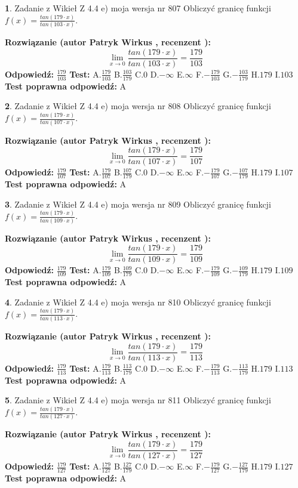 \documentclass[12pt, a4paper]{article}
\theoremstyle{definition} %
\newtheorem{zad}{}
\newcommand{\zadStart}[1]{\begin{zad}#1\newline}
\newcommand{\zadStop}{\end{zad}}
\newcommand{\rozwStart}[2]{\noindent \textbf{Rozwiązanie (autor #1 , recenzent #2): }\newline}
\newcommand{\rozwStop}{\newline}
\newcommand{\odpStart}{\noindent \textbf{Odpowiedź:}\newline}
\newcommand{\odpStop}{\newline}
\newcommand{\testStart}{\noindent \textbf{Test:}\newline}
\newcommand{\testStop}{\newline}
\newcommand{\kluczStart}{\noindent \textbf{Test poprawna odpowiedź:}\newline}
\newcommand{\kluczStop}{\newline}
\begin{document}
\zadStart{Zadanie z Wikieł Z 4.4 e) moja wersja nr 807}
Obliczyć granicę funkcji $f(x)=\frac{tan(179\cdot x)}{tan(103\cdot x)}$.
\zadStop
\rozwStart{Patryk Wirkus}{}
$$\lim\limits_{x\to 0}\frac{tan(179\cdot x)}{tan(103\cdot x)}=
\frac{179}{103}$$
\rozwStop
\odpStart
$\frac{179}{103}$
\odpStop
\testStart
A.$\frac{179}{103}$
B.$\frac{103}{179}$
C.$0$
D.$-\infty$
E.$\infty$
F.$-\frac{179}{103}$
G.$-\frac{103}{179}$
H.$179$
I.$103$
\testStop
\kluczStart
A
\kluczStop



\zadStart{Zadanie z Wikieł Z 4.4 e) moja wersja nr 808}
Obliczyć granicę funkcji $f(x)=\frac{tan(179\cdot x)}{tan(107\cdot x)}$.
\zadStop
\rozwStart{Patryk Wirkus}{}
$$\lim\limits_{x\to 0}\frac{tan(179\cdot x)}{tan(107\cdot x)}=
\frac{179}{107}$$
\rozwStop
\odpStart
$\frac{179}{107}$
\odpStop
\testStart
A.$\frac{179}{107}$
B.$\frac{107}{179}$
C.$0$
D.$-\infty$
E.$\infty$
F.$-\frac{179}{107}$
G.$-\frac{107}{179}$
H.$179$
I.$107$
\testStop
\kluczStart
A
\kluczStop



\zadStart{Zadanie z Wikieł Z 4.4 e) moja wersja nr 809}
Obliczyć granicę funkcji $f(x)=\frac{tan(179\cdot x)}{tan(109\cdot x)}$.
\zadStop
\rozwStart{Patryk Wirkus}{}
$$\lim\limits_{x\to 0}\frac{tan(179\cdot x)}{tan(109\cdot x)}=
\frac{179}{109}$$
\rozwStop
\odpStart
$\frac{179}{109}$
\odpStop
\testStart
A.$\frac{179}{109}$
B.$\frac{109}{179}$
C.$0$
D.$-\infty$
E.$\infty$
F.$-\frac{179}{109}$
G.$-\frac{109}{179}$
H.$179$
I.$109$
\testStop
\kluczStart
A
\kluczStop



\zadStart{Zadanie z Wikieł Z 4.4 e) moja wersja nr 810}
Obliczyć granicę funkcji $f(x)=\frac{tan(179\cdot x)}{tan(113\cdot x)}$.
\zadStop
\rozwStart{Patryk Wirkus}{}
$$\lim\limits_{x\to 0}\frac{tan(179\cdot x)}{tan(113\cdot x)}=
\frac{179}{113}$$
\rozwStop
\odpStart
$\frac{179}{113}$
\odpStop
\testStart
A.$\frac{179}{113}$
B.$\frac{113}{179}$
C.$0$
D.$-\infty$
E.$\infty$
F.$-\frac{179}{113}$
G.$-\frac{113}{179}$
H.$179$
I.$113$
\testStop
\kluczStart
A
\kluczStop



\zadStart{Zadanie z Wikieł Z 4.4 e) moja wersja nr 811}
Obliczyć granicę funkcji $f(x)=\frac{tan(179\cdot x)}{tan(127\cdot x)}$.
\zadStop
\rozwStart{Patryk Wirkus}{}
$$\lim\limits_{x\to 0}\frac{tan(179\cdot x)}{tan(127\cdot x)}=
\frac{179}{127}$$
\rozwStop
\odpStart
$\frac{179}{127}$
\odpStop
\testStart
A.$\frac{179}{127}$
B.$\frac{127}{179}$
C.$0$
D.$-\infty$
E.$\infty$
F.$-\frac{179}{127}$
G.$-\frac{127}{179}$
H.$179$
I.$127$
\testStop
\kluczStart
A
\kluczStop
\end{document}
